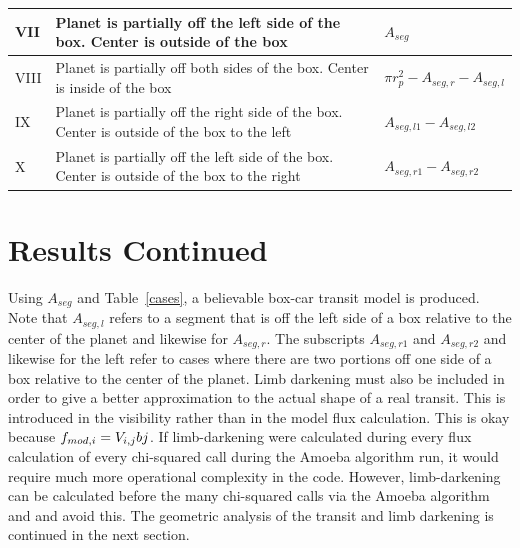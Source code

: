 \begin{table}
\begin{center}
\begin{tabular}{| m{} | m{} | m{} |}
			VII   &   Planet is partially off the left side of the box. Center is outside of the box                        & $A_{seg}$                                          \\ \hline
			VIII  &   Planet is partially off both sides of the box. Center is inside of the box                            & $\pi r_p^2 - A_{seg,r} - A_{seg,l}$ \\ \hline
			IX    &   Planet is partially off the right side of the box. Center is outside of the box to the left & $A_{seg,l1} - A_{seg,l2}$                \\ \hline
			X     &   Planet is partially off the left side of the box. Center is outside of the box to the right    & $A_{seg,r1} - A_{seg,r2}$               \\ \hline
		\end{tabular}
	\end{center}
\end{table}

\vspace{9mm}
\section{Results Continued \label{results_appendix}}
Using $A_{seg} $ and Table~\ref{cases}, a believable box-car transit model is produced. Note that $A_{seg,l}$ refers to a segment that is off the left side of a box relative to the center of the planet and likewise for $A_{seg,r}$. The subscripts $A_{seg,r1}$ and $A_{seg,r2}$ and likewise for the left refer to cases where there are two portions off one side of a box relative to the center of the planet. Limb darkening must also be included in order to give a better approximation to the actual shape of a real transit. This is introduced in the visibility rather than in the model flux calculation. This is okay because $\mbox{$f_{mod,i}$} = V_{i,j} b{j}$. If limb-darkening were calculated during every flux calculation of every chi-squared call during the Amoeba algorithm run, it would require much more operational complexity in the code. However, limb-darkening can be calculated before the many chi-squared calls via the Amoeba algorithm and and avoid this.  The geometric analysis of the transit and limb darkening is continued in the next section.



